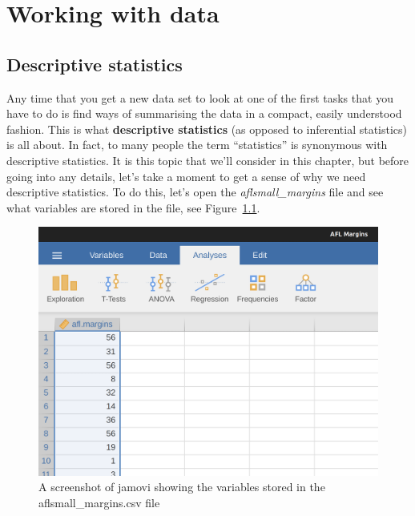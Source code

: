 \documentclass[
  a4paper,
]{book}
\begin{document}
\part{Working with data}

\hypertarget{sec-Descriptive-statistics}{%
\chapter{Descriptive statistics}\label{sec-Descriptive-statistics}}

Any time that you get a new data set to look at one of the first tasks
that you have to do is find ways of summarising the data in a compact,
easily understood fashion. This is what \textbf{descriptive statistics}
(as opposed to inferential statistics) is all about. In fact, to many
people the term ``statistics'' is synonymous with descriptive
statistics. It is this topic that we'll consider in this chapter, but
before going into any details, let's take a moment to get a sense of why
we need descriptive statistics. To do this, let's open the
\emph{aflsmall\_margins} file and see what variables are stored in the
file, see Figure~\ref{fig-fig4-1}.

\begin{figure}

\includegraphics[width=1\textwidth,height=\textheight]{images/fig4-1.png} \hfill{}

\caption{\label{fig-fig4-1}A screenshot of jamovi showing the variables
stored in the aflsmall\_margins.csv file}

\end{figure}
\end{document}
